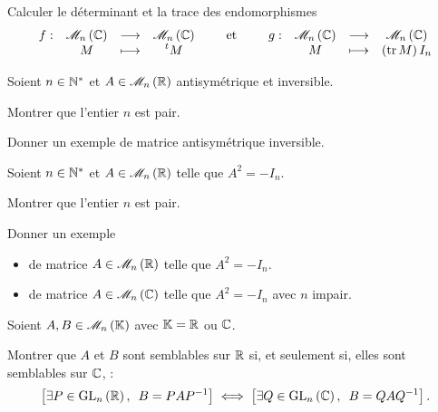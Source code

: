 \begin{corr}
\end{corr}

\begin{exo}[Exercice 9]
Calculer le déterminant et la trace des endomorphismes \[\fonction{f}{\M{n}[\C]}{\M{n}[\C]}{M}{\trans{M}}\qquad\text{et}\qquad\fonction{g}{\M{n}[\C]}{\M{n}[\C]}{M}{\paren{\tr M}I_n}\]
\end{exo}

\begin{corr}
\end{corr}

\begin{exo}[Exercice 10]
Soient \(n\in\mathbb{N}^*\) et \(A\in\M{n}[\R]\) antisymétrique et inversible.

Montrer que l'entier \(n\) est pair.

Donner un exemple de matrice antisymétrique inversible.
\end{exo}

\begin{corr}
\end{corr}

\begin{exo}[Exercice 11]
Soient \(n\in\mathbb{N}^*\) et \(A\in\M{n}[\R]\) telle que \(A^2=-I_n\).

Montrer que l'entier \(n\) est pair.

Donner un exemple

\begin{itemize}
\item de matrice \(A\in\M{n}[\R]\) telle que \(A^2=-I_n\). \\

\item de matrice \(A\in\M{n}[\C]\) telle que \(A^2=-I_n\) avec \(n\) impair.
\end{itemize}
\end{exo}

\begin{corr}
\end{corr}

\begin{exo}[Exercice 12]
Soient \(A,B\in\M{n}[\K]\) avec \(\mathbb{K}=\mathbb{R}\) ou \(\mathbb{C}\).

Montrer que \(A\) et \(B\) sont semblables sur \(\mathbb{R}\) si, et seulement si, elles sont semblables sur \(\mathbb{C}\), \cad : \[\croch{\quantifs{\exists P\in\GL{n}[\R]}B=PAP\inv}\ssi\croch{\quantifs{\exists Q\in\GL{n}[\C]}B=QAQ\inv}.\]
\end{exo}

